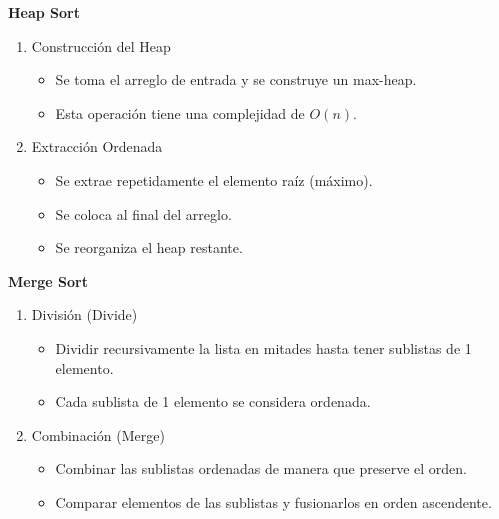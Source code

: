 \textbf{
Heap Sort
}
\begin{enumerate}
    \item Construcción del Heap
    \begin{itemize}
        \item Se toma el arreglo de entrada y se construye un max-heap.
        \item Esta operación tiene una complejidad de \(O(n)\).
    \end{itemize}

    \item Extracción Ordenada
    \begin{itemize}
        \item Se extrae repetidamente el elemento raíz (máximo).
        \item Se coloca al final del arreglo.
        \item Se reorganiza el heap restante.
    \end{itemize}
\end{enumerate}

\textbf{
Merge Sort
}
\begin{enumerate}
    \item División (Divide)
    \begin{itemize}
        \item Dividir recursivamente la lista en mitades hasta tener sublistas de 1 elemento.
        \item Cada sublista de 1 elemento se considera ordenada.
    \end{itemize}

    \item Combinación (Merge)
    \begin{itemize}
        \item Combinar las sublistas ordenadas de manera que preserve el orden.
        \item Comparar elementos de las sublistas y fusionarlos en orden ascendente.
    \end{itemize}
\end{enumerate}

